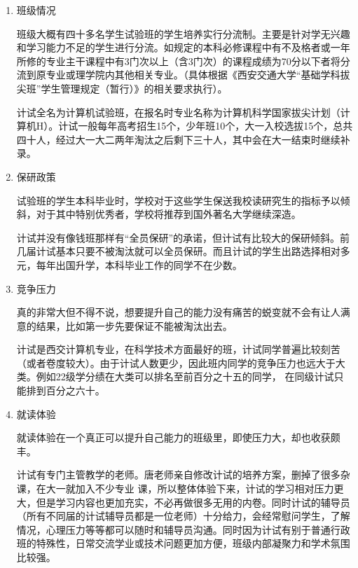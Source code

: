 \documentclass[zihao=-4,fontset=none]{Beautybook-CN}
\begin{document}
\begin{enumerate}
		
	\item 班级情况
	      	      
	      班级大概有四十多名学生试验班的学生培养实行分流制。主要是针对学无兴趣和学习能力不足的学生进行分流。如规定的本科必修课程中有不及格者或一年所修的专业主干课程中有3门次以上（含3门次）的课程成绩为70分以下者将分流到原专业或理学院内其他相关专业。（具体根据《西安交通大学“基础学科拔尖班”学生管理规定（暂行）》的相关要求执行）。
	      	      
	      计试全名为计算机试验班，在报名时专业名称为计算机科学国家拔尖计划（计算机H）。计试一般每年高考招生15个，少年班10个，大一入校选拔15个，总共四十人，经过大一大二两年淘汰之后剩下三十人，其中会在大一结束时继续补录。
	      	      
	\item 保研政策
	      	      
	      试验班的学生本科毕业时，学校对于这些学生保送我校读研究生的指标予以倾斜，对于其中特别优秀者，学校将推荐到国外著名大学继续深造。
	      	      
	      计试并没有像钱班那样有“全员保研”的承诺，但计试有比较大的保研倾斜。前几届计试基本只要不被淘汰就可以全员保研。而且计试的学生出路选择相对多元，每年出国升学，本科毕业工作的同学不在少数。
	      	      
	\item 竞争压力
	      	      
	      真的非常大但不得不说，想要提升自己的能力没有痛苦的蜕变就不会有让人满意的结果，比如第一步先要保证不能被淘汰出去。
	      	      
	      计试是西交计算机专业，在科学技术方面最好的班，计试同学普遍比较刻苦（或者卷度较大）。由于计试人数更少，因此班内同学的竞争压力也远大于大类。例如22级学分绩在大类可以排名至前百分之十五的同学， 在同级计试只能排到百分之六十。
	      	      
	\item 就读体验
	      	      
	      就读体验在一个真正可以提升自己能力的班级里，即使压力大，却也收获颇丰。
	      	      
	      计试有专门主管教学的老师。唐老师亲自修改计试的培养方案，删掉了很多杂课，在大一就加入不少专业 课，所以整体体验下来，计试的学习相对压力更大，但是学习内容也更加充实，不必再做很多无用的内卷。同时计试的辅导员（所有不同届的计试辅导员都是一位老师）十分给力，会经常慰问学生，了解情况，心理压力等等都可以随时和辅导员沟通。同时因为计试有别于普通行政班的特殊性，日常交流学业或技术问题更加方便，班级内部凝聚力和学术氛围比较强。
	      	      

\end{enumerate}
\end{document}
